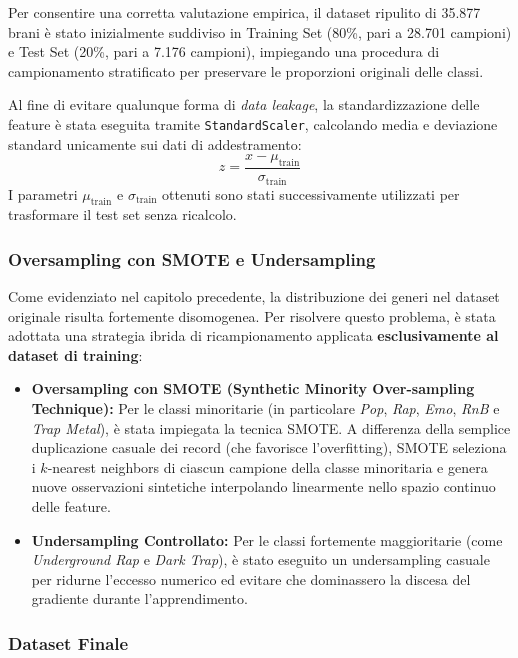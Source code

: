 \documentclass[12pt,a4paper]{article}
\begin{document}
Per consentire una corretta valutazione empirica, il dataset ripulito di 35.877 brani è stato inizialmente suddiviso in Training Set (80\%, pari a 28.701 campioni) e Test Set (20\%, pari a 7.176 campioni), impiegando una procedura di campionamento stratificato per preservare le proporzioni originali delle classi.

Al fine di evitare qualunque forma di \textit{data leakage}, la standardizzazione delle feature è stata eseguita tramite \texttt{StandardScaler}, calcolando media e deviazione standard unicamente sui dati di addestramento:
\begin{equation}
z = \frac{x - \mu_{\text{train}}}{\sigma_{\text{train}}}
\label{eq:standardizzazione}
\end{equation}
I parametri $\mu_{\text{train}}$ e $\sigma_{\text{train}}$ ottenuti sono stati successivamente utilizzati per trasformare il test set senza ricalcolo.

\subsubsection{Oversampling con SMOTE e Undersampling}

Come evidenziato nel capitolo precedente, la distribuzione dei generi nel dataset originale risulta fortemente disomogenea. Per risolvere questo problema, è stata adottata una strategia ibrida di ricampionamento applicata \textbf{esclusivamente al dataset di training}:
\begin{itemize}
    \item \textbf{Oversampling con SMOTE (Synthetic Minority Over-sampling Technique):} Per le classi minoritarie (in particolare \textit{Pop}, \textit{Rap}, \textit{Emo}, \textit{RnB} e \textit{Trap Metal}), è stata impiegata la tecnica SMOTE. A differenza della semplice duplicazione casuale dei record (che favorisce l'overfitting), SMOTE seleziona i $k$-nearest neighbors di ciascun campione della classe minoritaria e genera nuove osservazioni sintetiche interpolando linearmente nello spazio continuo delle feature.
    \item \textbf{Undersampling Controllato:} Per le classi fortemente maggioritarie (come \textit{Underground Rap} e \textit{Dark Trap}), è stato eseguito un undersampling casuale per ridurne l'eccesso numerico ed evitare che dominassero la discesa del gradiente durante l'apprendimento.
\end{itemize}

\subsubsection{Dataset Finale}
\end{document}

